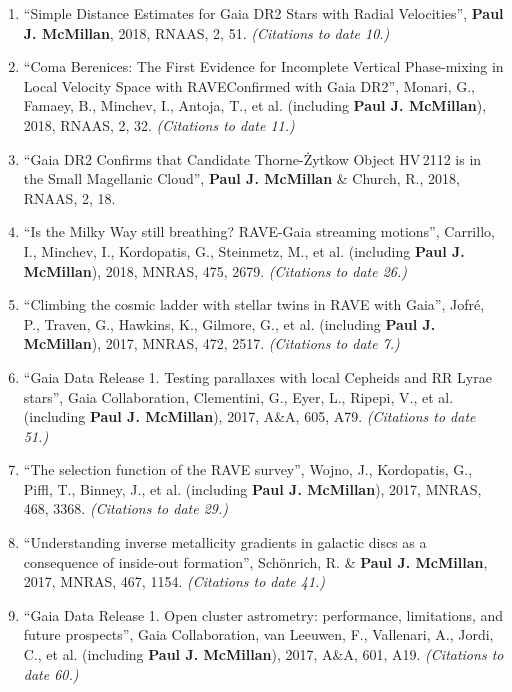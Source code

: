 \documentclass{resume}
\begin{document}
\begin{enumerate}
\item ``Simple Distance Estimates for Gaia DR2 Stars with Radial Velocities'', \textbf{Paul J. McMillan}, 2018, RNAAS, 2, 51. \textit{(Citations to date 10.)}

\item ``Coma Berenices: The First Evidence for Incomplete Vertical Phase-mixing in Local Velocity Space with RAVE{\textemdash}Confirmed with Gaia DR2'', Monari, G., Famaey, B., Minchev, I., Antoja, T., et al. (including \textbf{Paul J. McMillan}), 2018, RNAAS, 2, 32. \textit{(Citations to date 11.)}

\item ``Gaia DR2 Confirms that Candidate Thorne-\.Zytkow Object HV\,2112 is in the Small Magellanic Cloud'', \textbf{Paul J. McMillan} \& Church, R., 2018, RNAAS, 2, 18.

\item ``Is the Milky Way still breathing? RAVE-Gaia streaming motions'', Carrillo, I., Minchev, I., Kordopatis, G., Steinmetz, M., et al. (including \textbf{Paul J. McMillan}), 2018, MNRAS, 475, 2679. \textit{(Citations to date 26.)}

\item ``Climbing the cosmic ladder with stellar twins in RAVE with Gaia'', Jofr\'e, P., Traven, G., Hawkins, K., Gilmore, G., et al. (including \textbf{Paul J. McMillan}), 2017, MNRAS, 472, 2517. \textit{(Citations to date 7.)}

\item ``Gaia Data Release 1. Testing parallaxes with local Cepheids and RR Lyrae stars'', Gaia Collaboration, Clementini, G., Eyer, L., Ripepi, V., et al. (including \textbf{Paul J. McMillan}), 2017, A\&A, 605, A79. \textit{(Citations to date 51.)}

\item ``The selection function of the RAVE survey'', Wojno, J., Kordopatis, G., Piffl, T., Binney, J., et al. (including \textbf{Paul J. McMillan}), 2017, MNRAS, 468, 3368. \textit{(Citations to date 29.)}

\item ``Understanding inverse metallicity gradients in galactic discs as a consequence of inside-out formation'', Sch\"onrich, R. \& \textbf{Paul J. McMillan}, 2017, MNRAS, 467, 1154. \textit{(Citations to date 41.)}

\item ``Gaia Data Release 1. Open cluster astrometry: performance, limitations, and future prospects'', Gaia Collaboration, van Leeuwen, F., Vallenari, A., Jordi, C., et al. (including \textbf{Paul J. McMillan}), 2017, A\&A, 601, A19. \textit{(Citations to date 60.)}


\end{enumerate}
\end{document}
